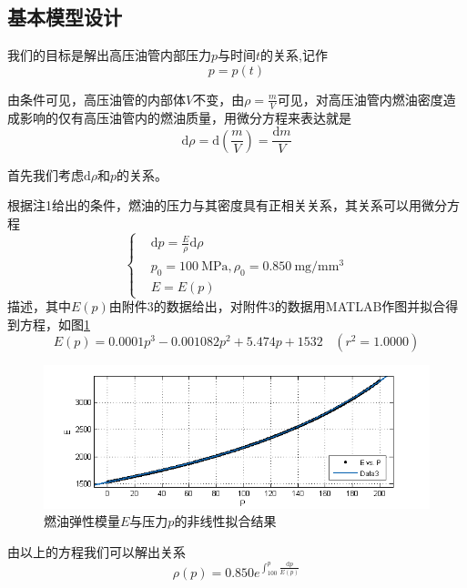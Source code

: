 \documentclass[12pt,AutoFakeBold]{article}%
\newcommand{\dif}{\mathrm{d}}
\begin{document}
    \subsection{基本模型设计}
    我们的目标是解出高压油管内部压力$p$与时间$t$的关系,记作
    \begin{equation}
        p=p(t)
    \end{equation}
    \par
    由条件可见，高压油管的内部体$V$不变，由$\rho=\frac{m}{V}$可见，对高压油管内燃油密度造成影响的仅有高压油管内的燃油质量，用微分方程来表达就是
    \begin{equation}
        \dif\rho=\dif\left(\frac{m}{V}\right)=\frac{\dif m}{V}
        \label{eq1}
    \end{equation}
    \par
    首先我们考虑$\dif\rho$和$p$的关系。\par
    根据注1给出的条件，燃油的压力与其密度具有正相关关系，其关系可以用微分方程
    \begin{equation}
         \begin{cases}
            &\dif p=\frac{E}{\rho}\dif\rho\\
            &p_0=\SI{100}{\MPa},\rho_0=\SI{0.850}{\mg\per\cubic\mm}\\
            &E=E(p)
        \end{cases}
        \label{pandrho}
    \end{equation}
    描述，其中$E(p)$由附件3的数据给出，对附件3的数据用MATLAB作图并拟合得到方程，如图\ref{data3}
    \begin{equation}
        E(p)=0.0001p^3-0.001082p^2+5.474p+1532\ \ \ \ (r^2=1.0000)
    \end{equation}
    \begin{figure}[H]
        \centering
        \includegraphics[scale=0.8]{figure/data3.png}
        \caption{燃油弹性模量$E$与压力$p$的非线性拟合结果}
        \label{data3}
    \end{figure}
    由以上的方程我们可以解出关系
    \begin{equation}
        \rho(p)=0.850e^{\int^p_{100}\frac{\dif p}{E(p)}}
        \label{eq2}
    \end{equation}
\end{document}

